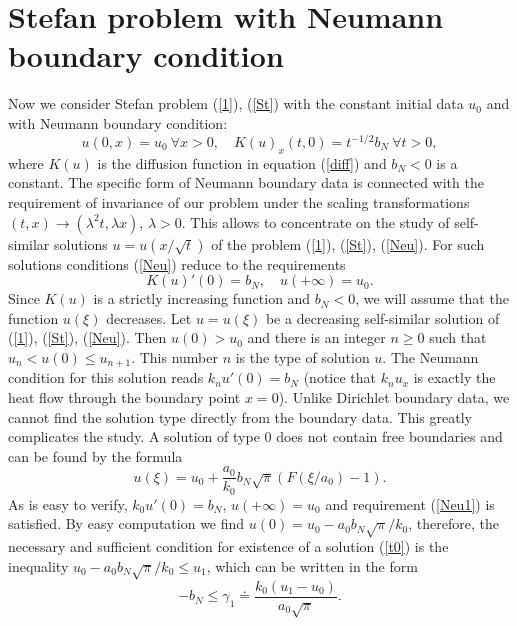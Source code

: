 \documentclass[12pt]{article}
\theoremstyle{plain}
\theoremstyle{definition}
\numberwithin{equation}{section}
\begin{document}
\section{Stefan problem with Neumann boundary condition}

Now we consider Stefan problem (\ref{1}), (\ref{St})
with the constant initial data $u_0$ and with Neumann boundary condition:
\begin{equation}\label{Neu}
u(0,x)=u_0 \ \forall x>0, \quad K(u)_x(t,0)=t^{-1/2} b_N \ \forall t>0,
\end{equation}
where $K(u)$ is the diffusion function in equation (\ref{diff}) and $b_N<0$ is a constant. The specific form of Neumann boundary data is connected with the requirement of invariance of our problem under the scaling transformations $(t,x)\to (\lambda^2 t,\lambda x)$, $\lambda>0$. This allows to concentrate on the study of self-similar solutions $u=u(x/\sqrt{t})$ of the problem (\ref{1}), (\ref{St}), (\ref{Neu}).
For such solutions conditions (\ref{Neu}) reduce to the requirements
\begin{equation}\label{Neu1}
K(u)'(0)=b_N, \quad u(+\infty)=u_0.
\end{equation}
Since $K(u)$ is a strictly increasing function and $b_N<0$, we will assume that the function $u(\xi)$ decreases.
Let $u=u(\xi)$ be a decreasing self-similar solution of (\ref{1}), (\ref{St}), (\ref{Neu}). Then $u(0)>u_0$ and there is an integer $n\ge 0$ such that $u_n<u(0)\le u_{n+1}$. This number $n$ is the type of solution $u$. The Neumann condition for this solution reads $k_nu'(0)=b_N$
(notice that $k_nu_x$ is exactly the heat flow through the boundary point $x=0$).
Unlike Dirichlet boundary data, we cannot find the solution type directly from the boundary data. This greatly complicates the study.
A solution of type $0$ does not contain free boundaries and can be found by the formula
\begin{equation}\label{t0}
u(\xi)=u_0+\frac{a_0}{k_0}b_N\sqrt{\pi}(F(\xi/a_0)-1).
\end{equation}
As is easy to verify, $k_0u'(0)=b_N$, $u(+\infty)=u_0$ and requirement (\ref{Neu1}) is satisfied. By easy computation we find $u(0)=u_0-a_0b_N\sqrt{\pi}/k_0$, therefore, the necessary and sufficient condition for existence of a solution (\ref{t0}) is the
inequality $u_0-a_0b_N\sqrt{\pi}/k_0\le u_1$, which can be written in the form
\begin{equation}\label{con0}
-b_N\le \gamma_1\doteq\frac{k_0(u_1-u_0)}{a_0\sqrt{\pi}}.
\end{equation}
\end{document}
